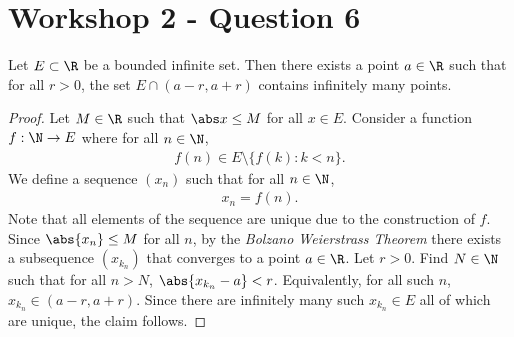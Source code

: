 \documentclass{article}
\begin{document}
\section{Workshop 2 - Question 6}

\begin{claim}
   Let $E\subset\R$ be a bounded infinite set.
   Then there exists a point $a\in\R$ such that for all $r>0$, the set
   $E\cap(a-r, a+r)$ contains infinitely many points.
\end{claim}
\begin{proof}
   Let $M\in\R$ such that $\abs x \leq M$ for all $x\in E$.
   Consider a function $f:\N\to E$ where for all $n\in\N$,
   \begin{align*}
      f(n) \in E \setminus \{f(k) : k < n\}.
   \end{align*}
   We define a sequence $(x_n)$ such that for all $n\in\N$,
   \begin{align*}
      x_n = f(n).
   \end{align*}
   Note that all elements of the sequence are unique due to the construction of $f$.
   Since $\abs{x_n}\leq M$ for all $n$, by the \emph{Bolzano Weierstrass Theorem} there exists a subsequence $(x_{k_n})$
   that converges to a point $a\in\R$. Let $r > 0$. Find $N\in\N$ such that for all $n>N$, $\abs{x_{k_n}-a}<r$. Equivalently,
   for all such $n$, $x_{k_n}\in(a-r, a+r)$. Since there are infinitely many such $x_{k_n}\in E$ all of which are unique,
   the claim follows. 
\end{proof}
\end{document}
